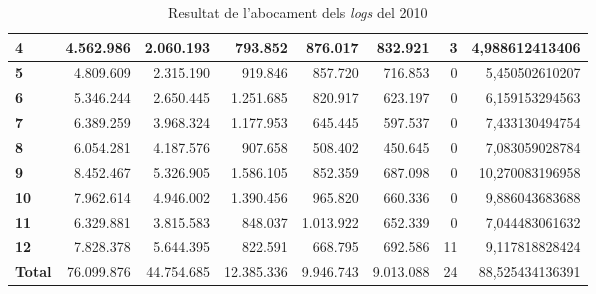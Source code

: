 \begin{table}[h!]
\begin{adjustbox}{width=1.2\textwidth, center}
\begin{tabular}{|l|r|r|r|r|r|r|r|}
            \textbf{4}     & 4.562.986  & 2.060.193  & 793.852    & 876.017   & 832.921   & 3  & 4,988612413406  \\
            \midrule
            \textbf{5}     & 4.809.609  & 2.315.190  & 919.846    & 857.720   & 716.853   & 0  & 5,450502610207  \\
            \textbf{6}     & 5.346.244  & 2.650.445  & 1.251.685  & 820.917   & 623.197   & 0  & 6,159153294563  \\
            \textbf{7}     & 6.389.259  & 3.968.324  & 1.177.953  & 645.445   & 597.537   & 0  & 7,433130494754  \\
            \textbf{8}     & 6.054.281  & 4.187.576  & 907.658    & 508.402   & 450.645   & 0  & 7,083059028784  \\
            \midrule
            \textbf{9}     & 8.452.467  & 5.326.905  & 1.586.105  & 852.359   & 687.098   & 0  & 10,270083196958 \\
            \textbf{10}    & 7.962.614  & 4.946.002  & 1.390.456  & 965.820   & 660.336   & 0  & 9,886043683688  \\
            \textbf{11}    & 6.329.881  & 3.815.583  & 848.037    & 1.013.922 & 652.339   & 0  & 7,044483061632  \\
            \textbf{12}    & 7.828.378  & 5.644.395  & 822.591    & 668.795   & 692.586   & 11 & 9,117818828424  \\
            \midrule
            \textbf{Total} & 76.099.876 & 44.754.685 & 12.385.336 & 9.946.743 & 9.013.088 & 24 & 88,525434136391 \\
            \bottomrule
        \end{tabular}
    \end{adjustbox}
    \caption{Resultat de l'abocament dels \textit{logs} del 2010}
    \label{tab:logs-table-2010}
\end{table}
